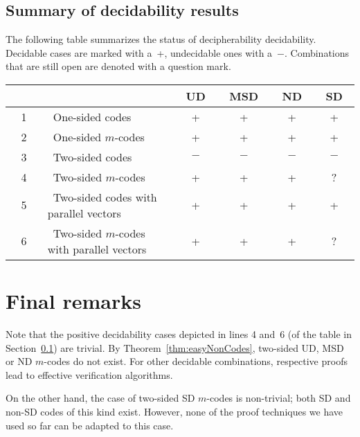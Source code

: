 \documentclass[final,nomarks]{dmtcs-episciences}
\begin{document}
\subsection{Summary of decidability results}
\label{subsec:summary}

The following table summarizes the status of decipherability decidability.
Decidable cases are marked with a~+, undecidable ones with a~$-$. Combinations
that are still open are denoted with a question mark.


\begin{center}
\begin{tabular}{|c|l|c|c|c|c|}
\hline
~~~~& & ~UD~ & ~MSD~ & ~ND~ & ~SD~\\
\hline
1 & ~One-sided codes & + & + & + & +\\
\hline
2 & ~One-sided $m$-codes & + & + & + & +\\
\hline
3 & ~Two-sided codes & $-$ & $-$ & $-$ & $-$\\
\hline
4 & ~Two-sided $m$-codes & + & + & + & ?\\
\hline
5 & ~Two-sided codes with parallel vectors & + & + & + & +\\
\hline
6 & ~Two-sided $m$-codes with parallel vectors~ & + & + & + & ?\\
\hline
\end{tabular}
\end{center}


\section{Final remarks}
\label{sec:final}

Note that the positive decidability cases depicted in lines 4
and~6 (of the table in Section~\ref{subsec:summary}) are trivial. By 
Theorem~\ref{thm:easyNonCodes}, two-sided
UD, MSD or ND $m$-codes do not exist. For other decidable
combinations, respective proofs lead to effective verification
algorithms.

On the other hand, the case of two-sided SD $m$-codes is
non-trivial; both SD and non-SD codes of this kind exist.
However, none of the proof techniques we have used so far can be
adapted to this case.




\end{document}
